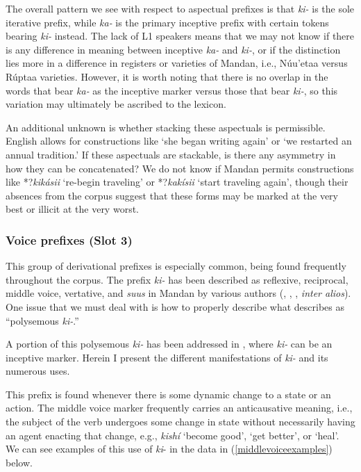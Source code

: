 The overall pattern we see with respect to aspectual prefixes is that \textit{ki-} is the sole iterative prefix, while \textit{ka-} is the primary inceptive prefix with certain tokens bearing \textit{ki-} instead. The lack of L1 speakers means that we may not know if there is any difference in meaning between inceptive \textit{ka-} and \textit{ki-}, or if the distinction lies more in a difference in registers or varieties of Mandan, i.e., Núu'etaa versus Rúptaa varieties. However, it is worth noting that there is no overlap in the words that bear \textit{ka-} as the inceptive marker versus those that bear \textit{ki-}, so this variation may ultimately be ascribed to the lexicon.

An additional unknown is whether stacking these aspectuals is permissible. English allows for constructions like `she began writing again' or `we restarted an annual tradition.' If these aspectuals are stackable, is there any asymmetry in how they can be concatenated? We do not know if Mandan permits constructions like *?\textit{kikásii} `re-begin traveling' or  *?\textit{kakísii} `start traveling again', though their absences from the corpus suggest that these forms may be marked at the very best or illicit at the very worst.

\subsubsection{Voice prefixes (Slot 3)}\label{SubsubsecVoicePrefixes}

This group of derivational prefixes is especially common, being found frequently throughout the corpus. The prefix \textit{ki-} has been described as reflexive, reciprocal, middle voice, vertative, and \textit{suus} in Mandan by various authors (\citealt{kennard1936}, \citealt{hollow1970}, \citealt{coberly1979}, \textit{inter alios}). One issue that we must deal with is how to properly describe what \citet[22]{mixco1997a} describes as ``polysemous \textit{ki-}.''

A portion of this polysemous \textit{ki-} has been addressed in , where \textit{ki-} can be an inceptive marker. Herein I present the different manifestations of \textit{ki-} and its numerous uses.


This prefix is found whenever there is some dynamic change to a state or an action. The middle voice marker frequently carries an anticausative meaning, i.e., the subject of the verb undergoes some change in state without necessarily having an agent enacting that change, e.g., \textit{kishí} `become good', `get better', or `heal'. We can see examples of this use of \textit{ki}- in the data in (\ref{middlevoiceexamples}) below.


